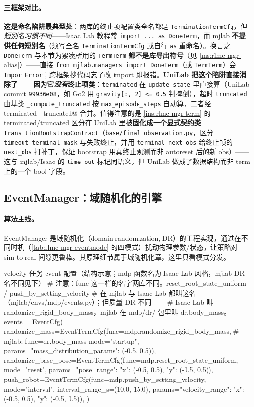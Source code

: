 \paragraph{三框架对比。}\textbf{这是命名陷阱最典型处}：两库的终止项配置类全名都是 \verb|TerminationTermCfg|，但 \emph{短别名习惯不同}——Isaac Lab 教程常 \verb|import ... as DoneTerm|，而 mjlab \textbf{不提供任何短别名}（须写全名 \verb|TerminationTermCfg| 或自行 \verb|as| 重命名）。换言之 \verb|DoneTerm| 与本节为紧凑所用的 \verb|TermTerm| \textbf{都不是库导出符号}（见 \cref{ins:rlmc-mgr-alias}）——直接 \verb|from mjlab.managers import DoneTerm|（或 \verb|TermTerm|）会 \verb|ImportError|；跨框架抄代码忘了改 import 即报错。\textbf{UniLab 把这个陷阱直接消除了——因为它\emph{没有}终止项类}：\verb|terminated| 在 \verb|update_state| 里直接算（UniLab commit \texttt{99936e08}，如 Go2 用 \verb|gravity[:, 2] <= 0.5| 判摔倒），超时 \verb|truncated| 由基类 \verb|_compute_truncated| 按 \verb|max_episode_steps| 自动算，二者经 \verb@done = terminated | truncated@ 合并。值得注意的是 \cref{ins:rlmc-mgr-term} 的 terminated/truncated 区分在 UniLab 里被\textbf{固化成一个显式契约类} \verb|TransitionBootstrapContract|（\texttt{base/final\_observation.py}，区分 \verb|timeout_terminal_mask| 与失败终止，并用 \verb|terminal_next_obs| 给终止帧的 \verb|next_obs| 打补丁，保证 bootstrap 用真终止观测而非 autoreset 后的新 obs）——这与 mjlab/Isaac 的 \verb|time_out| 标记同语义，但 UniLab 做成了数据结构而非 term 上的一个 bool 字段。

\subsection{EventManager：域随机化的引擎}
\label{sec:rlmc-mgr-event}

\paragraph{算法主线。}EventManager 是域随机化（domain randomization, DR）的工程实现，通过在不同时机（\cref{tab:rlmc-mgr-eventmode} 的四模式）扰动物理参数/状态，让策略对 sim-to-real 间隙更鲁棒。其原理细节属于域随机化章，这里只看模式分发。

\begin{codebox}[Python]{velocity 任务 event 配置（结构示意；mdp 函数名为 Isaac-Lab 风格，mjlab DR 名不同见下）}
# 注意：func 这一栏的名字两库不同。reset_root_state_uniform / push_by_setting_velocity
# 在 mjlab 与 Isaac Lab 都叫这名（mjlab/envs/mdp/events.py）；但质量 DR 不同——
# Isaac Lab 叫 randomize_rigid_body_mass，mjlab 在 mdp/dr/ 包里叫 dr.body_mass。
events = EventCfg(
    randomize_mass=EventTermCfg(func=mdp.randomize_rigid_body_mass,  # mjlab: func=dr.body_mass
        mode="startup", params={"mass_distribution_params": (-0.5, 0.5)}),
    randomize_base_pose=EventTermCfg(func=mdp.reset_root_state_uniform,
        mode="reset", params={"pose_range": {"x": (-0.5, 0.5), "y": (-0.5, 0.5)}}),
    push_robot=EventTermCfg(func=mdp.push_by_setting_velocity,
        mode="interval", interval_range_s=(10.0, 15.0),
        params={"velocity_range": {"x": (-0.5, 0.5), "y": (-0.5, 0.5)}}),
)
\end{codebox}

